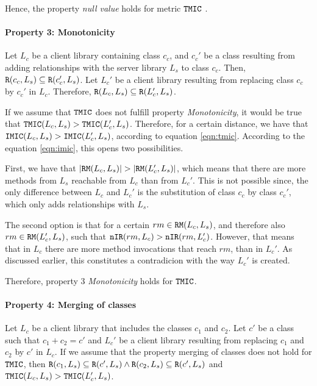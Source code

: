 Hence, the property \textit{null value} holds for metric $\verb|TMIC|$ .

\paragraph{Property 3: Monotonicity}
Let $L_c$ be a client library containing class $c_c$, and $c_c'$ be a class resulting from adding relationships with the server library $L_s$ to class $c_c$. Then, $\verb|R|(c_c, L_s) \subseteq \verb|R|(c_c', L_s)$. Let $L_c'$ be a client library resulting from replacing class $c_c$ by $c_c'$ in $L_c$. Therefore, $\verb|R|(L_c, L_s) \subseteq \verb|R|(L_c', L_s)$.

If we assume that $\verb|TMIC|$ does not fulfill property \textit{Monotonicity}, it would be true that $\verb|TMIC|(L_c, L_s) > \verb|TMIC|(L_c', L_s)$. Therefore, for a certain distance, we have that $\verb|IMIC|(L_c,L_s) > \verb|IMIC|(L_c',L_s)$, according to equation \ref{eqn:tmic}. According to the equation \ref{eqn:imic}, this opens two possibilities.

First, we have that $|\verb|RM|(L_c,L_s)| > |\verb|RM|(L_c',L_s)|$, which means that there are more methods from $L_s$ reachable from $L_c$ than from $L_c'$. This is not possible since, the only difference between $L_c$ and $L_c'$ is the substitution of class $c_c$ by class $c_c'$, which only adds relationships with $L_s$.

The second option is that for a certain $rm \in \verb|RM|(L_c,L_s)$, and therefore also $rm \in \verb|RM|(L_c',L_s)$, such that   $\verb|nIR|(rm,L_c) > \verb|nIR|(rm,L_c')$. However, that means that in $L_c$ there are more method invocations that reach $rm$, than in $L_c'$. As discussed earlier, this constitutes a contradicion with the way $L_c'$ is created.

Therefore, property 3 \textit{Monotonicity} holds for $\verb|TMIC|$.

\paragraph{Property 4: Merging of classes}
Let $L_c$ be a client library that includes the classes $c_1$ and $c_2$. Let $c'$ be a class such that $c_1 + c_2 = c'$ and $L_c'$ be a client library resulting from replacing $c_1$ and $c_2$ by $c'$ in $L_c$. If we assume that the property merging of classes does not hold for $\verb|TMIC|$, then $\verb|R|(c_1, L_s) \subseteq \verb|R|(c', L_s) \land \verb|R|(c_2, L_s) \subseteq \verb|R|(c', L_s)$ and $\verb|TMIC|(L_c, L_s) > \verb|TMIC|(L_c', L_s)$.

